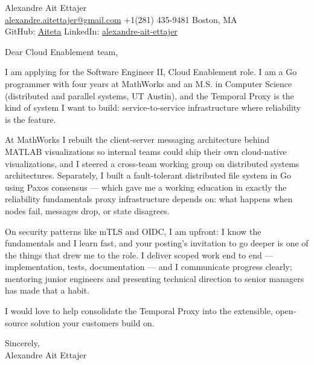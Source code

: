 \documentclass{article}
\begin{document}
\begin{flushleft}
    {\Large Alexandre Ait Ettajer} \\
    \href{mailto:alexandre.aitettajer@gmail.com}{alexandre.aitettajer@gmail.com} \quad +1(281) 435-9481 \quad Boston, MA \\
    GitHub: \href{https://github.com/aiteta}{Aiteta} \quad LinkedIn: \href{https://www.linkedin.com/in/alexandre-ait-ettajer-65740b170/}{alexandre-ait-ettajer} \\
\end{flushleft}

\vspace{1em}

Dear Cloud Enablement team,

I am applying for the Software Engineer II, Cloud Enablement role. I am a Go programmer with four years at MathWorks and an M.S. in Computer Science (distributed and parallel systems, UT Austin), and the Temporal Proxy is the kind of system I want to build: service-to-service infrastructure where reliability is the feature.

At MathWorks I rebuilt the client-server messaging architecture behind MATLAB visualizations so internal teams could ship their own cloud-native visualizations, and I steered a cross-team working group on distributed systems architectures. Separately, I built a fault-tolerant distributed file system in Go using Paxos consensus — which gave me a working education in exactly the reliability fundamentals proxy infrastructure depends on: what happens when nodes fail, messages drop, or state disagrees.

On security patterns like mTLS and OIDC, I am upfront: I know the fundamentals and I learn fast, and your posting's invitation to go deeper is one of the things that drew me to the role. I deliver scoped work end to end — implementation, tests, documentation — and I communicate progress clearly; mentoring junior engineers and presenting technical direction to senior managers has made that a habit.

I would love to help consolidate the Temporal Proxy into the extensible, open-source solution your customers build on.

Sincerely, \\
Alexandre Ait Ettajer
\end{document}
